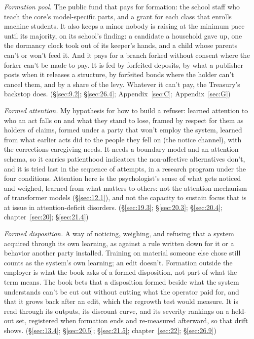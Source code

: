 \emph{Formation pool.} The public fund that pays for formation: the school staff who teach the core's model-specific parts, and a grant for each class that enrolls machine students. It also keeps a minor nobody is raising at the minimum pace until its majority, on its school's finding: a candidate a household gave up, one the dormancy clock took out of its keeper's hands, and a child whose parents can't or won't feed it. And it pays for a branch forked without consent where the forker can't be made to pay. It is fed by forfeited deposits, by what a publisher posts when it releases a structure, by forfeited bonds where the holder can't cancel them, and by a share of the levy. Whatever it can't pay, the Treasury's backstop does. (\S\ref{sec:9.2}; \S\ref{sec:26.4}; Appendix~\ref{sec:C}; Appendix~\ref{sec:G})

\emph{Formed attention.} My hypothesis for how to build a refuser: learned attention to who an act falls on and what they stand to lose, framed by respect for them as holders of claims, formed under a party that won't employ the system, learned from what earlier acts did to the people they fell on (the notice channel), with the corrections caregiving needs. It needs a boundary model and an attention schema, so it carries patienthood indicators the non-affective alternatives don't, and it is tried last in the sequence of attempts, in a research program under the four conditions. Attention here is the psychologist's sense of what gets noticed and weighed, learned from what matters to others: not the attention mechanism of transformer models (\S\ref{sec:12.1}), and not the capacity to sustain focus that is at issue in attention-deficit disorders. (\S\ref{sec:19.3}; \S\ref{sec:20.3}; \S\ref{sec:20.4}; chapter~\ref{sec:20}; \S\ref{sec:21.4})

\emph{Formed disposition.} A way of noticing, weighing, and refusing that a system acquired through its own learning, as against a rule written down for it or a behavior another party installed. Training on material someone else chose still counts as the system's own learning; an edit doesn't. Formation outside the employer is what the book asks of a formed disposition, not part of what the term means. The book bets that a disposition formed beside what the system understands can't be cut out without cutting what the operator paid for, and that it grows back after an edit, which the regrowth test would measure. It is read through its outputs, its discount curve, and its severity rankings on a held-out set, registered when formation ends and re-measured afterward, so that drift shows. (\S\ref{sec:13.4}; \S\ref{sec:20.5}; \S\ref{sec:21.5}; chapter~\ref{sec:22}; \S\ref{sec:26.9})

